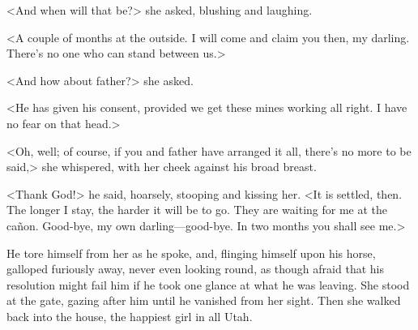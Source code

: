 <And when will that be?> she asked, blushing and laughing.

<A couple of months at the outside. I will come and claim you then, my darling. There's no one who can stand between us.>

<And how about father?> she asked.

<He has given his consent, provided we get these mines working all right. I have no fear on that head.>

<Oh, well; of course, if you and father have arranged it all, there's no more to be said,> she whispered, with her cheek against his broad breast.

<Thank God!> he said, hoarsely, stooping and kissing her. <It is settled, then. The longer I stay, the harder it will be to go. They are waiting for me at the cañon. Good-bye, my own darling—good-bye. In two months you shall see me.>

He tore himself from her as he spoke, and, flinging himself upon his horse, galloped furiously away, never even looking round, as though afraid that his resolution might fail him if he took one glance at what he was leaving. She stood at the gate, gazing after him until he vanished from her sight. Then she walked back into the house, the happiest girl in all Utah.